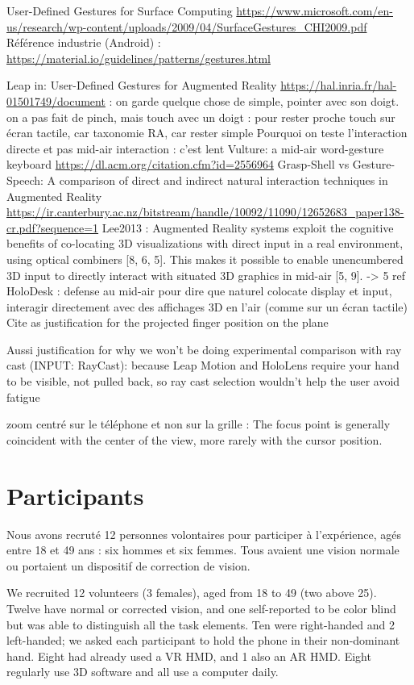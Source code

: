 User-Defined Gestures for Surface Computing \url{https://www.microsoft.com/en-us/research/wp-content/uploads/2009/04/SurfaceGestures_CHI2009.pdf}
Référence industrie (Android) : \url{https://material.io/guidelines/patterns/gestures.html}

Leap in:
User-Defined Gestures for Augmented Reality \url{https://hal.inria.fr/hal-01501749/document} : on garde quelque chose de simple, pointer avec son doigt. on a pas fait de pinch, mais touch avec un doigt : pour rester proche touch sur écran tactile, car taxonomie RA, car rester simple
Pourquoi on teste l'interaction directe et pas mid-air interaction : c'est lent Vulture: a mid-air word-gesture keyboard \url{https://dl.acm.org/citation.cfm?id=2556964}
Grasp-Shell vs Gesture-Speech: A comparison of direct and indirect natural interaction
techniques in Augmented Reality \url{https://ir.canterbury.ac.nz/bitstream/handle/10092/11090/12652683_paper138-cr.pdf?sequence=1}
Lee2013 : Augmented Reality systems exploit the cognitive benefits of co-locating 3D visualizations with direct input in a real environment, using optical combiners [8, 6, 5]. This makes it possible to enable unencumbered 3D input to directly interact with situated 3D graphics in mid-air [5, 9]. -> 5 ref HoloDesk : defense au mid-air pour dire que naturel colocate display et input, interagir directement avec des affichages 3D en l'air (comme sur un écran tactile)
Cite \cite{Chan2010} as justification for the projected finger position on the plane

Aussi justification for why we won’t be doing experimental comparison with ray cast (INPUT: RayCast): because Leap Motion and HoloLens require your hand to be visible, not pulled back, so ray cast selection wouldn’t help the user avoid fatigue

zoom centré sur le téléphone et non sur la grille : The focus point is generally coincident with the center of the view, more rarely with the cursor position. \cite{Guiard2004}


\section{Participants}
\label{sec:experiment_participants}
Nous avons recruté 12 personnes volontaires pour participer à l'expérience, agés entre 18 et 49 ans : six hommes et six femmes. Tous avaient une vision normale ou portaient un dispositif de correction de vision.

We recruited 12 volunteers (3 females), aged from 18 to 49 (two above 25). Twelve have normal or corrected vision, and one self-reported to be color blind but was able to distinguish all the task elements. Ten were right-handed and 2 left-handed; we asked each participant to hold the phone in their non-dominant hand. Eight had already used a VR HMD, and 1 also an AR HMD. Eight regularly use 3D software and all use a computer daily.



